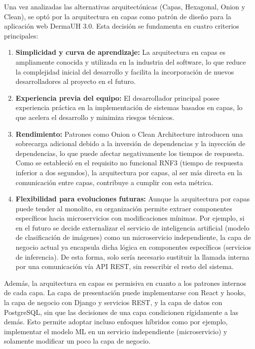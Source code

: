 Una vez analizadas las alternativas arquitectónicas (Capas, Hexagonal, Onion y Clean), 
se optó por la arquitectura en capas como patrón de diseño para la aplicación web DermaUH 3.0. 
Esta decisión se fundamenta en cuatro criterios principales:

\begin{enumerate}
    \item \textbf{Simplicidad y curva de aprendizaje:} La arquitectura en capas es ampliamente conocida y utilizada en la industria del software, lo que reduce la complejidad inicial del desarrollo y facilita la incorporación de nuevos desarrolladores al proyecto en el futuro\cite{layeredCommon}.
    \item \textbf{Experiencia previa del equipo:} El desarrollador principal posee experiencia práctica en la implementación de sistemas basados en capas, lo que acelera el desarrollo y minimiza riesgos técnicos.
    \item \textbf{Rendimiento:} Patrones como Onion o Clean Architecture introducen una sobrecarga adicional debido a la inversión de dependencias y la inyección de dependencias, lo que puede afectar negativamente los tiempos de respuesta. Como se estableció en el requisito no funcional RNF3 (tiempo de respuesta inferior a dos segundos), la arquitectura por capas, al ser más directa en la comunicación entre capas, contribuye a cumplir con esta métrica\cite{layeredPerformance}.
    \item \textbf{Flexibilidad para evoluciones futuras:} Aunque la arquitectura por capas puede tender al monolito, su organización permite extraer componentes específicos hacia microservicios con modificaciones mínimas. Por ejemplo, si en el futuro se decide externalizar el servicio de inteligencia artificial (modelo de clasificación de imágenes) como un microservicio independiente, la capa de negocio actual ya encapsula dicha lógica en componentes específicos (servicios de inferencia). De esta forma, solo sería necesario sustituir la llamada interna por una comunicación vía API REST, sin reescribir el resto del sistema\cite{layeredEvolution}.
\end{enumerate}

Además, la arquitectura en capas es permisiva en cuanto a los patrones internos de cada 
capa. La capa de presentación puede implementarse con React y hooks, la capa de negocio 
con Django y servicios REST, y la capa de datos con PostgreSQL, sin que las decisiones de 
una capa condicionen rígidamente a las demás. Esto permite adoptar incluso enfoques h\'ibridos
como por ejemplo, implementar el modelo ML en un servicio independiente (microservicio)
y solamente modificar un poco la capa de negocio.


